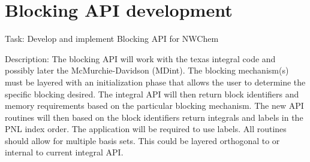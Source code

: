 \newpage

\section{Blocking API development}
Task: Develop and implement Blocking API for NWChem

Description: The blocking API will work with the texas integral code
and possibly later the McMurchie-Davidson (MDint).  The blocking
mechanism(s) must be layered with an initialization phase that allows
the user to determine the specific blocking desired.  The integral API
will then return block identifiers and memory requirements based on
the particular blocking mechanism.  The new API routines will then
based on the block identifiers return integrals and labels in the PNL
index order.  The application will be required to use labels.  All
routines should allow for multiple basis sets.  This could be layered
orthogonal to or internal to current integral API. 

